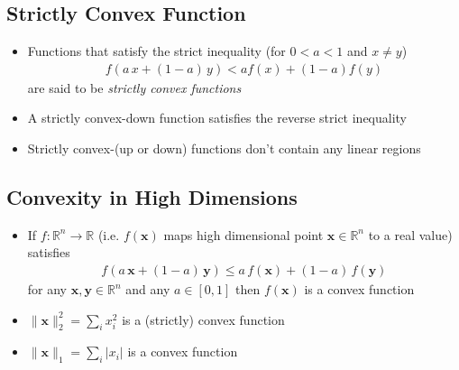 \begin{slide}
\section{Strictly Convex Function}

\begin{PauseHighLight}
  \begin{itemize}
  \item Functions that satisfy the strict inequality (for $0<a<1$ and
    $x\neq y$)
    \begin{align*}
      f(a \,x + (1-a)\, y) < a f(x) + (1-a) f(y)
    \end{align*}
    are said to be \emph{strictly convex functions}\pause
  \item A strictly convex-down function satisfies the reverse strict
    inequality\pause
  \item Strictly convex-(up or down) functions don't contain any
    linear regions\pause
  \end{itemize}
\end{PauseHighLight}

\end{slide}



\begin{slide}
\section{Convexity in High Dimensions}

\begin{PauseHighLight}
  \begin{itemize}
  \item If $f:\mathbb{R}^n \to \mathbb{R}$ (i.e. $f(\bm{x})$ maps
    high dimensional point $\bm{x}\in \mathbb{R}^n$ to a real value)
    satisfies
    \begin{align*}
      f(a \,\bm{x} + (1-a)\, \bm{y}) \leq  a \, f(\bm{x}) + (1-a) \, f(\bm{y})
    \end{align*}
    for any $\bm{x}, \bm{y}\in \mathbb{R}^n$ and any $a\in[0,1]$
    then $f(\bm{x})$ is a convex function\pause
  \item $\|\bm{x}\|_2^2 = \sum\limits_i x_i^2$ is a (strictly) convex function\pause
  \item $\|\bm{x}\|_1 = \sum\limits_i |x_i|$ is a convex function\pause
  \end{itemize}
\end{PauseHighLight}

\end{slide}


